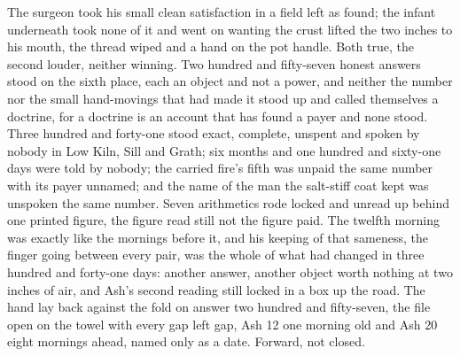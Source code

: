 The surgeon took his small clean satisfaction in a field left as found; the infant underneath took none of it and went on wanting the crust lifted the two inches to his mouth, the thread wiped and a hand on the pot handle. Both true, the second louder, neither winning. Two hundred and fifty-seven honest answers stood on the sixth place, each an object and not a power, and neither the number nor the small hand-movings that had made it stood up and called themselves a doctrine, for a doctrine is an account that has found a payer and none stood. Three hundred and forty-one stood exact, complete, unspent and spoken by nobody in Low Kiln, Sill and Grath; six months and one hundred and sixty-one days were told by nobody; the carried fire's fifth was unpaid the same number with its payer unnamed; and the name of the man the salt-stiff coat kept was unspoken the same number. Seven arithmetics rode locked and unread up  behind one printed figure, the figure read still not the figure paid. The twelfth morning was exactly like the mornings before it, and his keeping of that sameness, the finger going between every pair, was the whole of what had changed in three hundred and forty-one days: another answer, another object worth nothing at two inches of air, and Ash's second reading still locked in a box up the road. The hand lay back against the fold on answer two hundred and fifty-seven, the file open on the towel with every gap left gap, Ash 12 one morning old and Ash 20 eight mornings ahead, named only as a date. Forward, not closed.
